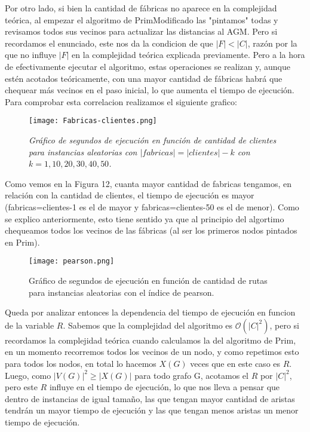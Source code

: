 \documentclass[A4paper,oneside,fleqn,11pt]{article}
\theoremstyle{definition}
\begin{document}
Por otro lado, si bien la cantidad de fábricas no aparece en la complejidad teórica, al empezar el algoritmo de PrimModificado las "pintamos" todas y revisamos todos sus vecinos para actualizar las distancias al AGM. Pero si recordamos el enunciado, este nos da la condicion de que  $|F|<|C|$, razón por la que no influye $|F|$ en la complejidad teórica explicada previamente. Pero a la hora de efectivamente ejecutar el algoritmo, estas operaciones se realizan y, aunque estén acotados teóricamente, con una mayor cantidad de fábricas habrá que chequear más vecinos en el paso inicial, lo que aumenta el tiempo de ejecución. Para comprobar esta correlacion realizamos el siguiente grafico:

\begin{wrapfigure}{R}{0.6\textwidth}
\centering
\texttt{[image: Fabricas-clientes.png]}
\caption{ \textit{Gráfico de segundos de ejecución en función de cantidad de clientes para instancias aleatorias con $|fabricas|=|clientes|-k$ con $k=1, 10, 20, 30, 40, 50$.}}
\end{wrapfigure}

Como vemos en la Figura 12, cuanta mayor cantidad de fabricas tengamos, en relación con la cantidad de clientes, el tiempo de ejecución es mayor (fabricas=clientes-1 es el de mayor y fabricas=clientes-50 es el de menor). Como se explico anteriormente, esto tiene sentido ya que al principio del algortimo chequeamos todos los vecinos de las fábricas (al ser los primeros nodos pintados en Prim).


 
 \begin{wrapfigure}[14]{R}{0.4\textwidth}
\centering
\texttt{[image: pearson.png]}
\caption{ Gráfico de segundos de ejecución en función de cantidad de rutas para instancias aleatorias con el índice de pearson.}
\end{wrapfigure}
 
  
 Queda por analizar entonces la dependencia del tiempo de ejecución en funcion de la variable $R$. Sabemos que la complejidad del algoritmo es $\mathcal{O} (|C|^2)$, pero si recordamos la complejidad teórica cuando calculamos la del algoritmo de Prim, en un momento recorremos todos los vecinos de un nodo, y como repetimos esto para todos los nodos, en total lo hacemos $X(G)$ veces que en este caso es $R$. Luego, como $|V(G)|^2 \geq |X(G)|$ para todo grafo G, acotamos el $R$ por $|C|^2$, pero este $R$ influye en el tiempo de ejecución, lo que nos lleva a pensar que dentro de instancias de igual tamaño, las que tengan mayor cantidad de aristas tendrán un mayor tiempo de ejecución y las que tengan menos aristas un menor tiempo de ejecución.
\end{document}
